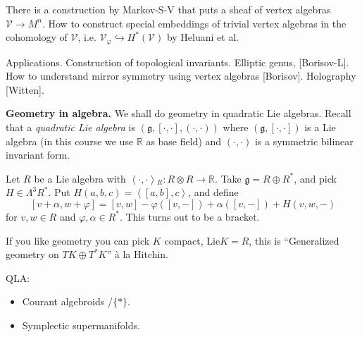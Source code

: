 There is a construction by Markov-S-V that
puts a sheaf
of vertex algebras $\mathcal{V} \to M^n$.
How to construct special embeddings of
trivial vertex algebras
in the cohomology of $\mathcal{V}$, i.e.
$\mathcal{V}_\varphi \hookrightarrow
H^*(\mathcal{V})$
by Heluani et al.

\medskip\noindent
Applications. Construction of topological
invariants.
Elliptic genus, [Borisov-L].
How to understand mirror symmetry using
vertex algebras [Borisov].
Holography [Witten].

\medskip\noindent
{\bf Geometry in algebra.}
We shall do geometry in quadratic Lie
algebras.
Recall that a {\it quadratic Lie algebra} is
 $(\mathfrak{g},[\cdot,\cdot],
 (\cdot,\cdot))$ where
$(\mathfrak{g},[\cdot,\cdot])$ is a Lie
algebra
(in this course we use $\mathbb{R}$ as base
field)
and $(\cdot,\cdot)$ is a symmetric bilinear
invariant form.

\begin{example}
\label{example-quadratic-Lie-algebra}
Let $R$ be a Lie algebra with
$\left\langle{}\cdot,\cdot\right\rangle{}_R: R \otimes R \to
\mathbb{R}$.
Take $\mathfrak{g}=R \oplus R^*$,
and pick $H \in \Lambda^{3}R^*$.
Put $H(a,b,c)=\left\langle{}[a,b],c\right\rangle{}$, and
define
$$
[v+\alpha,w+\varphi]=[v,w]-\varphi([v,-])+
\alpha([v,-])+H(v,w,-)
$$
for $v,w \in R$ and $\varphi,\alpha \in R
^*$. This turns out to be a bracket.

If you like geometry you can pick $K$
compact, $\text{Lie}K=R$,
this is ``Generalized geometry on $T K \oplus
T^* K$''
à la Hitchin.
\end{example}

\medskip\noindent
QLA:
\begin{itemize}
\item Courant algebroids /$\{*\}$.
\item  Symplectic supermanifolds.
\end{itemize}

